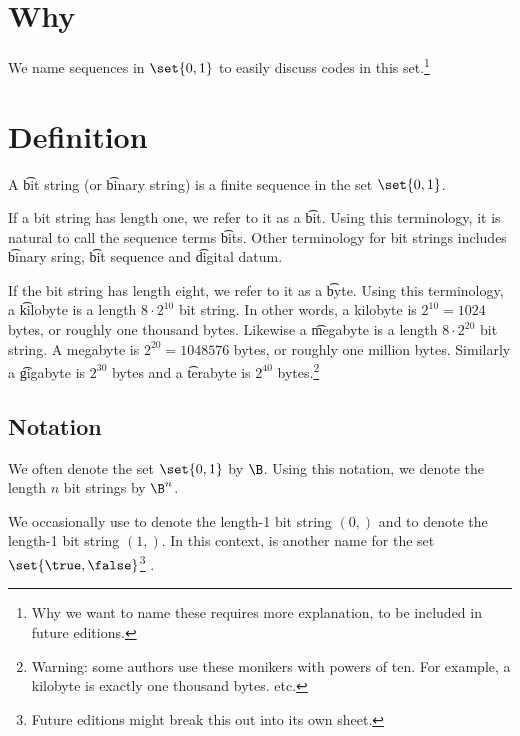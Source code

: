 
\section*{Why}

We name sequences in $\set{0, 1}$ to easily discuss codes in this set.\footnote{Why we want to name these requires more explanation, to be included in future editions.}

\section*{Definition}

A \t{bit string} (or \t{binary string}) is a finite sequence in the set $\set{0, 1}$.

If a bit string has length one, we refer to it as a \t{bit}.
Using this terminology, it is natural to call the sequence terms \t{bits}.
Other terminology for bit strings includes \t{binary sring}, \t{bit sequence} and \t{digital datum}.

If the bit string has length eight, we refer to it as a \t{byte}.
Using this terminology, a \t{kilobyte} is a length $8 \cdot 2^{10}$ bit string.
In other words, a kilobyte is $2^{10} = 1024$ bytes, or roughly one thousand bytes.
Likewise a \t{megabyte} is a length $8 \cdot 2^{20}$ bit string.
A megabyte is $2^{20} = 1048576$ bytes, or roughly one million bytes.
Similarly a \t{gigabyte} is $2^{30}$ bytes and a \t{terabyte} is $2^{40}$ bytes.\footnote{Warning: some authors use these monikers with powers of ten. For example, a kilobyte is exactly one thousand bytes. etc.}

\subsection*{Notation}

We often denote the set $\set{0,1}$ by $\B$.
Using this notation, we denote the length $n$ bit strings by $\B^n$.

We occasionally use \false to denote the length-1 bit string $(0,)$ and \true to denote the length-1 bit string $(1,)$.
In this context, \bool is another name for the set $\set{\true, \false}$\footnote{Future editions might break this out into its own sheet.}
.

\blankpage
